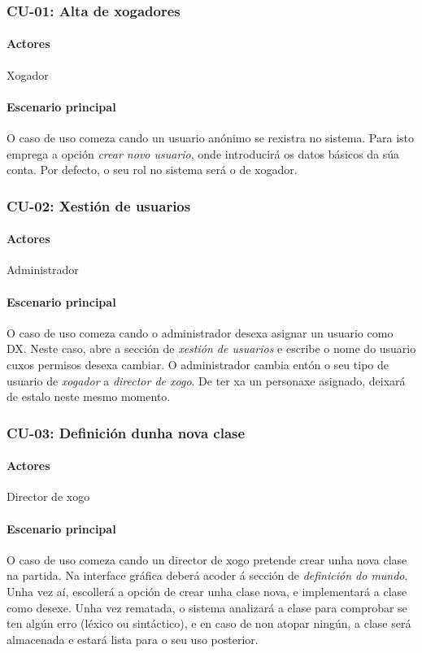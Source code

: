 \subsubsection{CU-01: Alta de xogadores}
\paragraph{Actores}
Xogador
\paragraph{Escenario principal}
O caso de uso comeza cando un usuario anónimo se rexistra no sistema. Para isto
emprega a opción {\it crear novo usuario}, onde introducirá os datos básicos da
súa conta. Por defecto, o seu rol no sistema será o de xogador.

\subsubsection{CU-02: Xestión de usuarios}
\paragraph{Actores}
Administrador
\paragraph{Escenario principal}
O caso de uso comeza cando o administrador desexa asignar un usuario como DX.
Neste caso, abre a sección de {\it xestión de usuarios} e escribe o nome do
usuario cuxos permisos desexa cambiar. O administrador cambia entón o seu tipo
de usuario de {\it xogador} a {\it director de xogo}. De ter xa un personaxe
asignado, deixará de estalo neste mesmo momento.


\subsubsection{CU-03: Definición dunha nova clase}
\paragraph{Actores}
Director de xogo
\paragraph{Escenario principal}
O caso de uso comeza cando un director de xogo pretende crear unha nova clase na
partida. Na interface gráfica deberá acoder á sección de {\it definición do
mundo}. Unha vez aí, escollerá a opción de crear unha clase nova, e implementará
a clase como desexe. Unha vez rematada, o sistema analizará a clase para
comprobar se ten algún erro (léxico ou sintáctico), e en caso de non atopar
ningún, a clase será almacenada e estará lista para o seu uso posterior.

